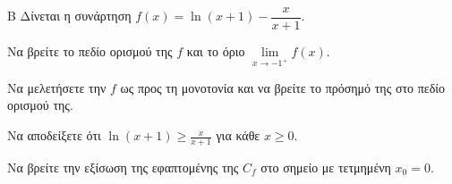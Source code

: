 \begin{thema}{Β}
Δίνεται η συνάρτηση $f(x) = \ln(x+1) - \dfrac{x}{x+1}$.
\begin{erwthma}
\item Να βρείτε το πεδίο ορισμού της $f$ και το όριο $\lim\limits_{x \to -1^+} f(x)$. 
\item Να μελετήσετε την $f$ ως προς τη μονοτονία και να βρείτε το πρόσημό της στο πεδίο ορισμού της.
\item Να αποδείξετε ότι $\ln(x+1) \ge \frac{x}{x+1}$ για κάθε $x \ge 0$.
\item Να βρείτε την εξίσωση της εφαπτομένης της $C_f$ στο σημείο με τετμημένη $x_0=0$.
\end{erwthma}
\end{thema}
